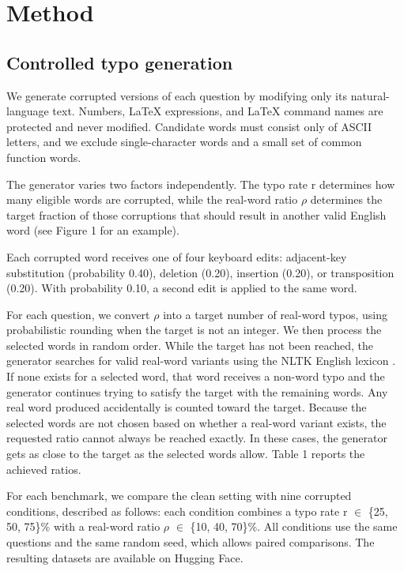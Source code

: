 \documentclass[11pt]{article}
\begin{document}
\section{Method}
\subsection{Controlled typo generation}
We generate corrupted versions of each question by modifying only its natural-language text. Numbers, LaTeX expressions, and LaTeX command names are protected and never modified. Candidate words must consist only of ASCII letters, and we exclude single-character words and a small set of common function words.

The generator varies two factors independently. The typo rate r determines how many eligible words are corrupted, while the real-word ratio $\rho$ determines the target fraction of those corruptions that should result in another valid English word (see Figure 1 for an example).

Each corrupted word receives one of four keyboard edits: adjacent-key substitution (probability 0.40), deletion (0.20), insertion (0.20), or transposition (0.20). With probability 0.10, a second edit is applied to the same word.

For each question, we convert $\rho$ into a target number of real-word typos, using probabilistic rounding when the target is not an integer. We then process the selected words in random order. While the target has not been reached, the generator searches for valid real-word variants using the NLTK English lexicon \citep{bird2009}. If none exists for a selected word, that word receives a non-word typo and the generator continues trying to satisfy the target with the remaining words. Any real word produced accidentally is counted toward the target. Because the selected words are not chosen based on whether a real-word variant exists, the requested ratio cannot always be reached exactly. In these cases, the generator gets as close to the target as the selected words allow. Table 1 reports the achieved ratios.

For each benchmark, we compare the clean setting with nine corrupted conditions, described as follows: each condition combines a typo rate r $\in$ \{25, 50, 75\}\% with a real-word ratio $\rho$ $\in$ \{10, 40, 70\}\%. All conditions use the same questions and the same random seed, which allows paired comparisons. The resulting datasets are available on Hugging Face.
\end{document}
